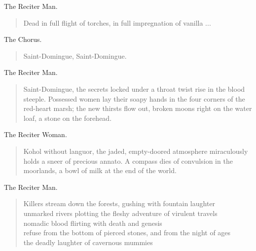 \documentclass[letterpaper,article,12pt,oneside,notitlepage]{memoir}
\begin{document}
\begin{center}The Reciter Man.\end{center}

\begin{verse}
\hspace{1cm} Dead in full flight of torches, in full impregnation of vanilla ... \\
\end{verse}

\begin{center}The Chorus.\end{center}

\begin{verse}
\hspace{1cm} Saint-Domingue, Saint-Domingue. \\
\end{verse}

\begin{center}The Reciter Man.\end{center}

\begin{verse}
\indent Saint-Domingue, the secrets locked under a throat twist rise in the blood steeple. Possessed women lay their soapy hands in the four corners of the red-heart marsh; the new thirsts flow out, broken moons right on the water loaf, a stone on the forehead. \\
\end{verse}

\begin{center}The Reciter Woman.\end{center}

\begin{verse}
\indent Kohol without languor, the jaded, empty-doored atmosphere miraculously holds a sneer of precious annato. A compass dies of convulsion in the moorlands, a bowl of milk at the end of the world. \\
\end{verse}

\begin{center}The Reciter Man.\end{center}

\begin{verse}
\hspace{1cm} Killers stream down the forests, gushing with fountain laughter \\
unmarked rivers plotting the fleshy adventure of virulent travels \\
nomadic blood flirting with death and genesis \\
refuse from the bottom of pierced stones, and from the night of ages \\
the deadly laughter of cavernous mummies \\
\end{verse}
\end{document}
